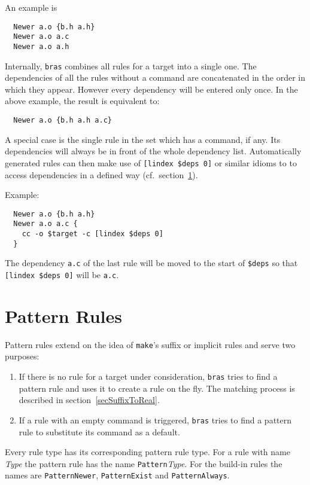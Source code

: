 \documentclass[12pt]{article}
\newcommand{\bras}{\texttt{bras}}
\newcommand{\make}{\texttt{make}}
\begin{document}
An example is 
\begin{verbatim}
  Newer a.o {b.h a.h}
  Newer a.o a.c
  Newer a.o a.h
\end{verbatim}

Internally, \bras{} combines all rules for a target into a single
one. The dependencies of all the rules without a command are
concatenated in the order in which they appear. However every
dependency will be entered only once. In the above example, the result
is equivalent to: 
\begin{verbatim}
  Newer a.o {b.h a.h a.c}
\end{verbatim}

A special case is the single rule in the set which has a command, if
any. Its dependencies will always be in front of the whole dependency
list.  Automatically generated rules can then make use of
\texttt{[lindex \$deps 0]} or similar idioms to to access dependencies
in a defined way (cf.\ section~\ref{secPatRules}).

Example:
\begin{verbatim}
  Newer a.o {b.h a.h}
  Newer a.o a.c {
    cc -o $target -c [lindex $deps 0]
  }
\end{verbatim}
The dependency \texttt{a.c} of the last rule will be moved to the
start of \texttt{\$deps} so that \verb|[lindex $deps 0]| will be
\texttt{a.c}. 



\section{Pattern Rules}
\label{secPatRules}

Pattern rules extend on the idea of \make's suffix or implicit
rules and serve two purposes:

\begin{enumerate}
\item 
If there is no rule for a target under consideration, \bras{}
tries to find a pattern rule and uses it to create a rule on
the fly. The matching process is described in
section~\ref{secSuffixToReal}.
\item 
If a rule with an empty command is triggered, \bras{} tries
to find a pattern rule to substitute its command as a default.
\end{enumerate}

Every rule type has its corresponding pattern rule type. 
For a rule with name \textit{Type} the pattern rule has the name
\texttt{Pattern}\textit{Type}. For the build-in rules the names are
\texttt{PatternNewer}, \texttt{PatternExist} and
\texttt{PatternAlways}.
\end{document}
